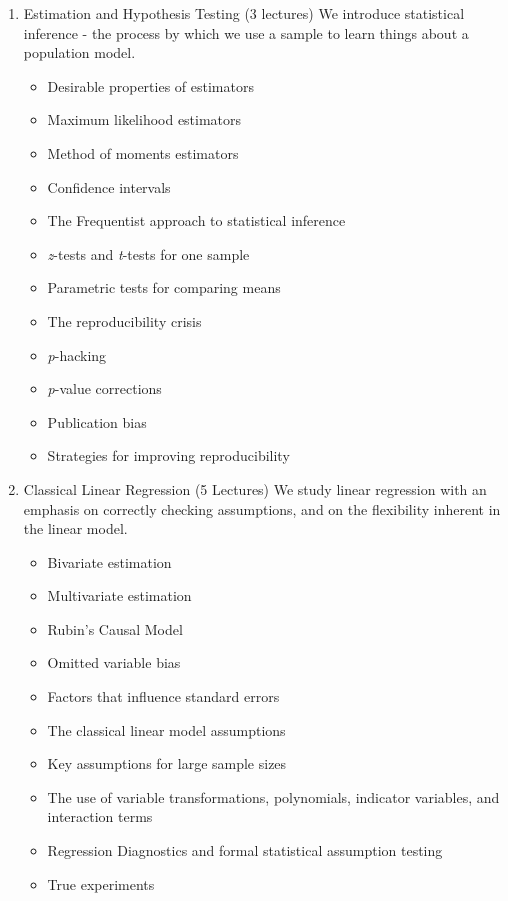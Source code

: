 \documentclass[11pt, a4paper]{article}
\begin{document}
\begin{enumerate}
  \item Estimation and Hypothesis Testing (3 lectures)
  We introduce statistical inference - the process by which we use a sample to learn things about a population model.
    \begin{itemize}
          \item Desirable properties of estimators
          \item Maximum likelihood estimators
          \item Method of moments estimators
          \item Confidence intervals
          \item The Frequentist approach to statistical inference
	  \item \textit{z}-tests and \textit{t}-tests for one sample
	  \item Parametric tests for comparing means
	  \item The reproducibility crisis
	  \item \textit{p}-hacking
      \item \textit{p}-value corrections
      \item Publication bias
      \item Strategies for improving reproducibility
    \end{itemize}

  \item Classical Linear Regression (5 Lectures)  
  We study linear regression with an emphasis on correctly checking assumptions, and on the flexibility inherent in the linear model.
  
    \begin{itemize}
      \item Bivariate estimation
      \item Multivariate estimation
      \item Rubin's Causal Model
      \item Omitted variable bias
      \item Factors that influence standard errors
      \item The classical linear model assumptions
      \item Key assumptions for large sample sizes
      \item The use of variable transformations, polynomials, indicator variables, and interaction terms
      \item Regression Diagnostics and formal statistical assumption testing
      \item True experiments
    \end{itemize}
    


\end{enumerate}
\end{document}
